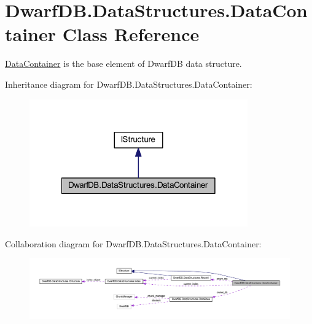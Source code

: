 \hypertarget{class_dwarf_d_b_1_1_data_structures_1_1_data_container}{
\section{DwarfDB.DataStructures.DataContainer Class Reference}
\label{class_dwarf_d_b_1_1_data_structures_1_1_data_container}
}


\hyperlink{class_dwarf_d_b_1_1_data_structures_1_1_data_container}{DataContainer} is the base element of DwarfDB data structure.  




Inheritance diagram for DwarfDB.DataStructures.DataContainer:
\nopagebreak
\begin{figure}[H]
\begin{center}
\leavevmode
\includegraphics[width=266pt]{class_dwarf_d_b_1_1_data_structures_1_1_data_container__inherit__graph}
\end{center}
\end{figure}


Collaboration diagram for DwarfDB.DataStructures.DataContainer:
\nopagebreak
\begin{figure}[H]
\begin{center}
\leavevmode
\includegraphics[width=400pt]{class_dwarf_d_b_1_1_data_structures_1_1_data_container__coll__graph}
\end{center}
\end{figure}
